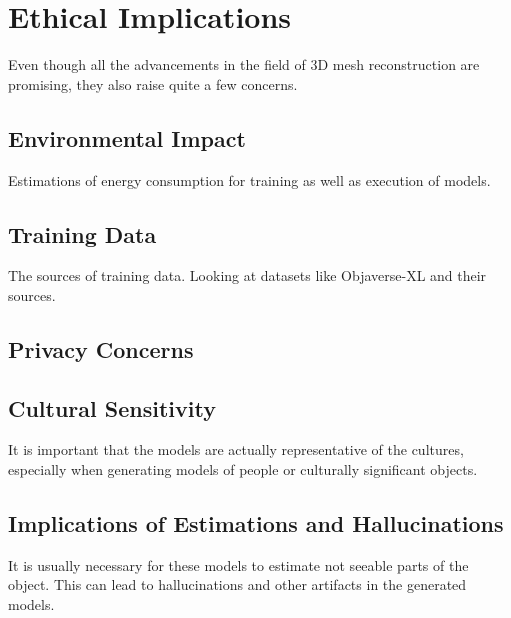 \section{Ethical Implications}
Even though all the advancements in the field of 3D mesh reconstruction are promising, they also raise quite a few concerns.

\subsection{Environmental Impact}
Estimations of energy consumption for training as well as execution of models.

\subsection{Training Data}
The sources of training data. Looking at datasets like Objaverse-XL \autocite{deitke_objaverse-xl_2023} and their sources.

\subsection{Privacy Concerns}

\subsection{Cultural Sensitivity}
It is important that the models are actually representative of the cultures, especially when generating models of people or culturally significant objects.

\subsection{Implications of Estimations and Hallucinations}
It is usually necessary for these models to estimate not seeable parts of the object. This can lead to hallucinations and other artifacts in the generated models.



